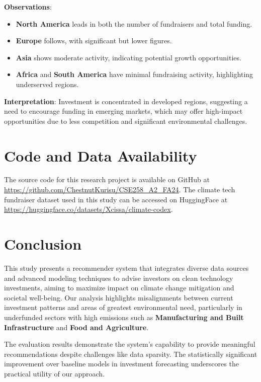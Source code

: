 \documentclass[sigconf]{acmart}
\begin{document}
\textbf{Observations}:

\begin{itemize}
    \item \textbf{North America} leads in both the number of fundraisers and total funding.
    \item \textbf{Europe} follows, with significant but lower figures.
    \item \textbf{Asia} shows moderate activity, indicating potential growth opportunities.
    \item \textbf{Africa} and \textbf{South America} have minimal fundraising activity, highlighting underserved regions.
\end{itemize}

\textbf{Interpretation}: Investment is concentrated in developed regions, suggesting a need to encourage funding in emerging markets, which may offer high-impact opportunities due to less competition and significant environmental challenges.

\section{Code and Data Availability}

The source code for this research project is available on GitHub at \url{https://github.com/ChestnutKurisu/CSE258_A2_FA24}. The climate tech fundraiser dataset used in this study can be accessed on HuggingFace at \url{https://huggingface.co/datasets/Xcissa/climate-codex}.

\section{Conclusion}

This study presents a recommender system that integrates diverse data sources and advanced modeling techniques to advise investors on clean technology investments, aiming to maximize impact on climate change mitigation and societal well-being. Our analysis highlights misalignments between current investment patterns and areas of greatest environmental need, particularly in underfunded sectors with high emissions such as \textbf{Manufacturing and Built Infrastructure} and \textbf{Food and Agriculture}.

The evaluation results demonstrate the system's capability to provide meaningful recommendations despite challenges like data sparsity. The statistically significant improvement over baseline models in investment forecasting underscores the practical utility of our approach.
\end{document}
